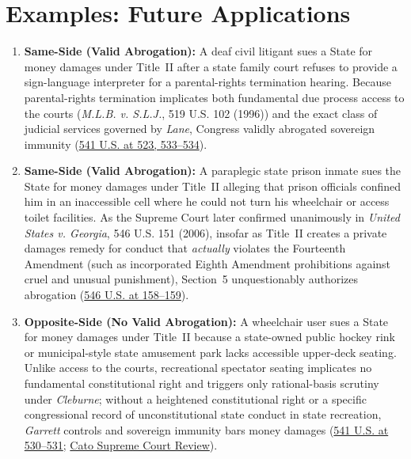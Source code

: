 \documentclass[12pt]{article}
\begin{document}
\section{Examples: Future Applications}
\begin{enumerate}
    \item \textbf{Same-Side (Valid Abrogation):} A deaf civil litigant sues a State for money damages under Title~II after a state family court refuses to provide a sign-language interpreter for a parental-rights termination hearing. Because parental-rights termination implicates both fundamental due process access to the courts (\textit{M.L.B. v. S.L.J.}, 519 U.S. 102 (1996)) and the exact class of judicial services governed by \textit{Lane}, Congress validly abrogated sovereign immunity (\href{https://www.law.cornell.edu/supremecourt/text/541/509}{541 U.S. at 523, 533--534}).

    \item \textbf{Same-Side (Valid Abrogation):} A paraplegic state prison inmate sues the State for money damages under Title~II alleging that prison officials confined him in an inaccessible cell where he could not turn his wheelchair or access toilet facilities. As the Supreme Court later confirmed unanimously in \textit{United States v. Georgia}, 546 U.S. 151 (2006), insofar as Title~II creates a private damages remedy for conduct that \textit{actually} violates the Fourteenth Amendment (such as incorporated Eighth Amendment prohibitions against cruel and unusual punishment), Section~5 unquestionably authorizes abrogation (\href{https://supreme.justia.com/cases/federal/us/546/151/}{546 U.S. at 158--159}).

    \item \textbf{Opposite-Side (No Valid Abrogation):} A wheelchair user sues a State for money damages under Title~II because a state-owned public hockey rink or municipal-style state amusement park lacks accessible upper-deck seating. Unlike access to the courts, recreational spectator seating implicates no fundamental constitutional right and triggers only rational-basis scrutiny under \textit{Cleburne}; without a heightened constitutional right or a specific congressional record of unconstitutional state conduct in state recreation, \textit{Garrett} controls and sovereign immunity bars money damages (\href{https://www.law.cornell.edu/supremecourt/text/541/509}{541 U.S. at 530--531}; \href{https://www.cato.org/supreme-court-review/2003-2004/tennessee-v-lane-how-illegitimate-power-negated-non-existent-immunity}{Cato Supreme Court Review}).


\end{enumerate}
\end{document}
